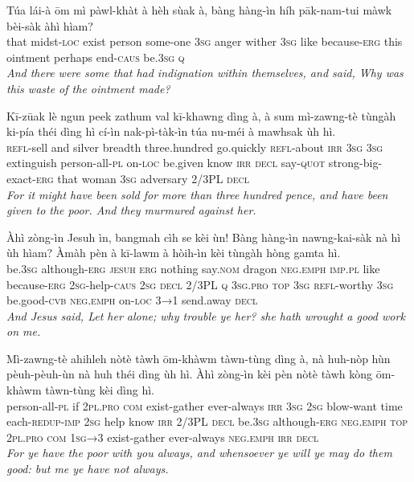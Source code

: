 \documentclass[11pt,a4paper]{article}
\begin{document}
\begin{exe}
\gll Túa lái-à ōm mì pàwl-khàt à hèh sùak à, bàng hàng-ìn híh pāk-nam-tui màwk bèi-sàk àhì hìam? \\
     that midst-\textsc{loc} exist person some-one \textsc{3sg} anger wither \textsc{3sg} like because-\textsc{erg} this ointment perhaps end-\textsc{caus} be.\textsc{3sg} \textsc{q} \\
\glt \textcolor{kjvcolor}{\textit{And there were some that had indignation within themselves, and said, Why was this waste of the ointment made?}}

\gll Kī-zūak lè ngun peek zathum val kī-khawng dìng à, à sum mì-zawng-tè tùngàh ki-pía théi dìng hì cí-ìn nak-pì-tàk-ìn túa nu-méi à mawhsak ùh hì. \\
     \textsc{refl}-sell and silver breadth three.hundred go.quickly \textsc{refl}-about \textsc{irr} \textsc{3sg} \textsc{3sg} extinguish person-all-\textsc{pl} on-\textsc{loc} be.given know \textsc{irr} \textsc{decl} say-\textsc{quot} strong-big-exact-\textsc{erg} that woman \textsc{3sg} adversary 2/3PL \textsc{decl} \\
\glt \textcolor{kjvcolor}{\textit{For it might have been sold for more than three hundred pence, and have been given to the poor. And they murmured against her.}}

\gll Àhì zòng-ìn Jesuh ìn, bangmah cìh se kèi ùn! Bàng hàng-ìn nawng-kai-sàk nà hì ùh hìam? Àmàh pèn à kī-lawm à hòih-ìn kèi tùngàh hòng gamta hì. \\
     be.\textsc{3sg} although-\textsc{erg} \textsc{jesuh} \textsc{erg} nothing say.\textsc{nom} dragon \textsc{neg}.\textsc{emph} \textsc{imp}.\textsc{pl} like because-\textsc{erg} \textsc{2sg}-help-\textsc{caus} \textsc{2sg} \textsc{decl} 2/3PL \textsc{q} \textsc{3sg}.\textsc{pro} \textsc{top} \textsc{3sg} \textsc{refl}-worthy \textsc{3sg} be.good-\textsc{cvb} \textsc{neg}.\textsc{emph} on-\textsc{loc} \textsc{3→1} send.away \textsc{decl} \\
\glt \textcolor{kjvcolor}{\textit{And Jesus said, Let her alone; why trouble ye her? she hath wrought a good work on me.}}

\gll Mì-zawng-tè ahihleh nòtè tàwh ōm-khàwm tàwn-tùng dìng à, nà huh-nòp hùn pèuh-pèuh-ùn nà huh théi dìng ùh hì. Àhì zòng-ìn kèi pèn nòtè tàwh kòng ōm-khàwm tàwn-tùng kèi dìng hì. \\
     person-all-\textsc{pl} if \textsc{2pl}.\textsc{pro} \textsc{com} exist-gather ever-always \textsc{irr} \textsc{3sg} \textsc{2sg} blow-want time each-\textsc{redup}-\textsc{imp} \textsc{2sg} help know \textsc{irr} 2/3PL \textsc{decl} be.\textsc{3sg} although-\textsc{erg} \textsc{neg}.\textsc{emph} \textsc{top} \textsc{2pl}.\textsc{pro} \textsc{com} \textsc{1sg→3} exist-gather ever-always \textsc{neg}.\textsc{emph} \textsc{irr} \textsc{decl} \\
\glt \textcolor{kjvcolor}{\textit{For ye have the poor with you always, and whensoever ye will ye may do them good: but me ye have not always.}}


\end{exe}
\end{document}
